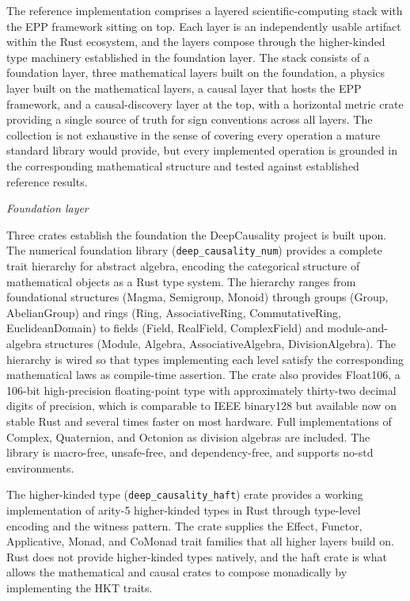 The reference implementation comprises a layered scientific-computing stack with the EPP framework sitting on top. Each layer is an independently usable artifact within the Rust ecosystem, and the layers compose through the higher-kinded type machinery established in the foundation layer. The stack consists of a foundation layer, three mathematical layers built on the foundation, a physics layer built on the mathematical layers, a causal layer that hosts the EPP framework, and a causal-discovery layer at the top, with a horizontal metric crate providing a single source of truth for sign conventions across all layers. The collection is not exhaustive in the sense of covering every operation a mature standard library would provide, but every implemented operation is grounded in the corresponding mathematical structure and tested against established reference results.
 
\textit{Foundation layer} 

Three crates establish the foundation the DeepCausality project is built upon. The numerical foundation library (\texttt{deep\_causality\_num}) provides a complete trait hierarchy for abstract algebra, encoding the categorical structure of mathematical objects as a Rust type system. The hierarchy ranges from foundational structures (Magma, Semigroup, Monoid) through groups (Group, AbelianGroup) and rings (Ring, AssociativeRing, CommutativeRing, EuclideanDomain) to fields (Field, RealField, ComplexField) and module-and-algebra structures (Module, Algebra, AssociativeAlgebra, DivisionAlgebra). The hierarchy is wired so that types implementing each level satisfy the corresponding mathematical laws as compile-time assertion. The crate also provides Float106, a 106-bit high-precision floating-point type with approximately thirty-two decimal digits of precision, which is comparable to IEEE binary128 but available now on stable Rust and several times faster on most hardware. Full implementations of Complex, Quaternion, and Octonion as division algebras are included. The library is macro-free, unsafe-free, and dependency-free, and supports no-std environments. 

The higher-kinded type (\texttt{deep\_causality\_haft}) crate provides a working implementation of arity-5 higher-kinded types in Rust through type-level encoding and the witness pattern. The crate supplies the Effect, Functor, Applicative, Monad, and CoMonad trait families that all higher layers build on. Rust does not provide higher-kinded types natively, and the haft crate is what allows the mathematical and causal crates to compose monadically by implementing the HKT traits.

